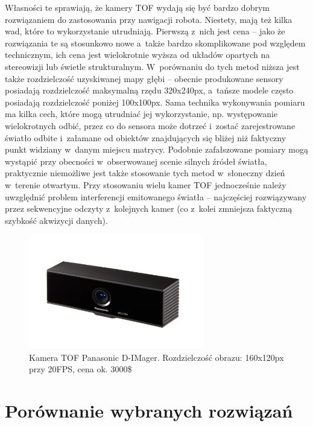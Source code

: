 Własności te sprawiają, że kamery TOF wydają się być bardzo dobrym rozwiązaniem
do zastosowania przy nawigacji robota. Niestety, mają też kilka wad, które to
wykorzystanie utrudniają. Pierwszą z~nich jest cena -- jako że rozwiązania te są
stosunkowo nowe a~także bardzo skomplikowane pod względem technicznym, ich cena
jest wielokrotnie wyższa od układów opartych na stereowizji lub świetle
strukturalnym. W~porównaniu do tych metod niższa jest także rozdzielczość
uzyskiwanej mapy głębi -- obecnie produkowane sensory posiadają rozdzielczość
maksymalną rzędu 320x240px, a~tańsze modele często posiadają rozdzielczość
poniżej 100x100px. Sama technika wykonywania pomiaru ma kilka cech, które mogą
utrudniać jej wykorzystanie, np. występowanie wielokrotnych odbić, przez co
do sensora może dotrzeć i~zostać zarejestrowane światło odbite i~załamane od
obiektów znajdujących się bliżej niż faktyczny punkt widziany w~danym miejscu
matrycy. Podobnie zafałszowane pomiary mogą wystąpić przy obecności 
w~obserwowanej scenie silnych źródeł światła, praktycznie niemożliwe jest także
stosowanie tych metod w~słoneczny dzień w~terenie otwartym. Przy stosowaniu
wielu kamer TOF jednocześnie należy uwzględnić problem interferencji emitowanego
światła -- najczęściej rozwiązywany przez sekwencyjne odczyty z~kolejnych kamer
(co z~kolei zmniejsza faktyczną szybkość akwizycji danych).

\begin{figure}[h!]
\centering
\includegraphics[height=5cm]{../../Common/img/dimager}
\caption[Kamera TOF Panasonic D-IMager]{Kamera TOF Panasonic D-IMager.
Rozdzielczość obrazu: 160x120px przy 20FPS, cena ok. 3000\$}
\label{fig:dimager}
\end{figure}

\section{Porównanie wybranych rozwiązań}

